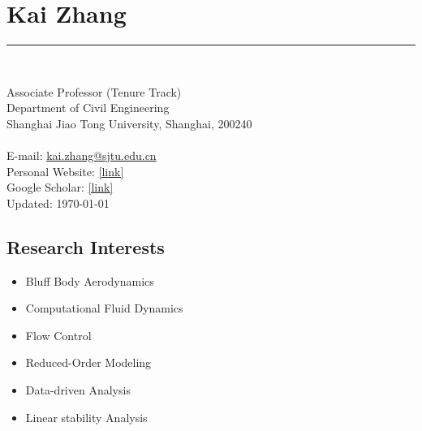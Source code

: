 \documentclass[10pt]{article}
\newenvironment{myitemize}
{ \begin{itemize}
    \setlength{\itemsep}{0pt}
    \setlength{\parskip}{0pt}
    \setlength{\parsep}{0pt}     }
{ \end{itemize}                  }
\begin{document}
\section*{{\Large Kai Zhang }} 
\vspace{+0.15in}

\vspace{-0.34in}
\begin{center}
\rule{\textwidth}{0.5pt}
\end{center}
\vspace{-0.57in}
~\\
\begin{multicols}{2}
\noindent Associate Professor (Tenure Track)\\ 
Department of Civil Engineering\\
Shanghai Jiao Tong University, Shanghai, 200240\\
~\\
E-mail: \href{kai.zhang@sjtu.edu.cn}{kai.zhang@sjtu.edu.cn}\\
Personal Website: \href{}{[link]} \\
Google Scholar: \href{https://scholar.google.com/citations?user=xQ9TdtgAAAAJ&hl=en}{[link]}\\
\null\hfill {\scriptsize Updated: \today}
\end{multicols}

\subsection*{Research Interests}

\begin{multicols}{2}
\begin{myitemize}
\item Bluff Body Aerodynamics
\item Computational Fluid Dynamics
\item Flow Control
\item Reduced-Order Modeling
\item Data-driven Analysis
\item Linear stability Analysis


\end{myitemize}
\end{multicols}
\end{document}
